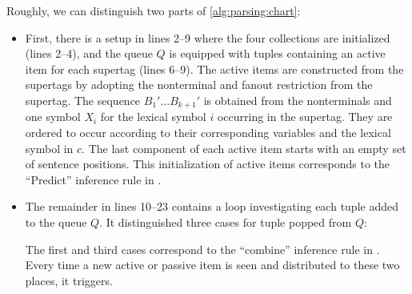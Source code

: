 \documentclass[../../document.tex]{subfiles}
\begin{document}
    Roughly, we can distinguish two parts of \cref{alg:parsing:chart}:
    \begin{itemize}
        \item First, there is a setup in lines 2--9 where the four collections are initialized (lines 2--4), and the queue \(Q\) is equipped with tuples containing an active item for each supertag (lines 6--9).
            The active items are constructed from the supertags by adopting the  nonterminal and fanout restriction from the supertag.
            The sequence \(B_1' \ldots B_{k+1}'\) is obtained from the  nonterminals and one symbol \(X_i\) for the lexical symbol \(i\) occurring in the supertag.
            They are ordered to occur according to their corresponding variables and the lexical symbol in \(c\).
            The last component of each active item starts with an empty set of sentence positions.
            This initialization of active items corresponds to the ``Predict'' inference rule in .
        \item
            The remainder in lines 10--23 contains a loop investigating each tuple added to the queue \(Q\).
            It distinguished three cases for tuple popped from \(Q\):
            The first and third cases correspond to the ``combine'' inference rule in .
            Every time a new active or passive item is seen and distributed to these two places, it triggers.
    \end{itemize}
\end{document}
